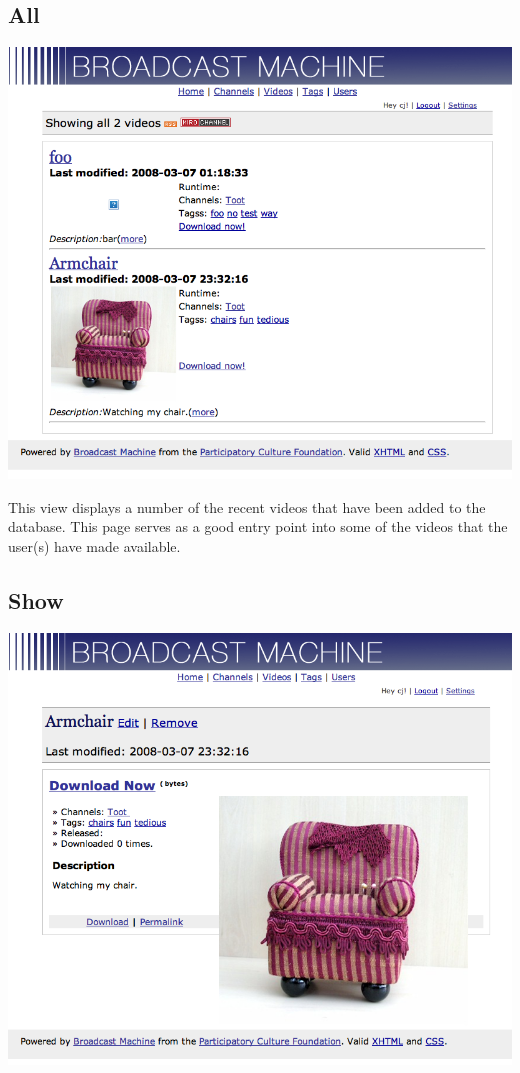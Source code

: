 \documentclass[a4paper,12pt]{report}
\begin{document}
\subsection{All}
\includegraphics[width=150mm]{images/videoall.png}

This view displays a number of the recent videos that have been added to the database.
This page serves as a good entry point into some of the videos that the user(s) have made available.

\subsection{Show}
\includegraphics[width=150mm]{images/videoshow.png}
\end{document}
